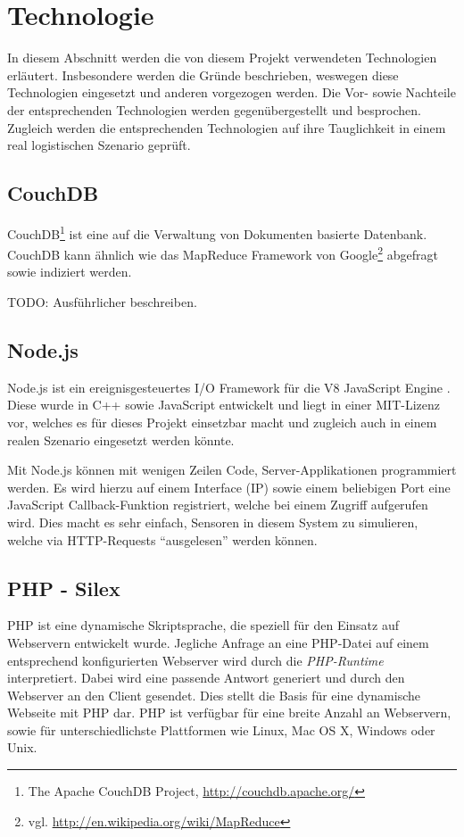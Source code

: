 \section{Technologie}
\label{sec:technology}

In diesem Abschnitt werden die von diesem Projekt verwendeten Technologien erläutert. Insbesondere werden die Gründe beschrieben, weswegen diese Technologien eingesetzt und anderen vorgezogen werden. Die Vor- sowie Nachteile der entsprechenden Technologien werden gegenübergestellt und besprochen. Zugleich werden die entsprechenden Technologien auf ihre Tauglichkeit in einem real logistischen Szenario geprüft.

\subsection{CouchDB}
\label{subsec:couchdb}
CouchDB\footnote{The Apache CouchDB Project, \url{http://couchdb.apache.org/}} ist eine auf die Verwaltung von Dokumenten basierte Datenbank. CouchDB kann ähnlich wie das MapReduce Framework von Google\footnote{vgl. \url{http://en.wikipedia.org/wiki/MapReduce}} abgefragt sowie indiziert werden.

TODO: Ausführlicher beschreiben.

\subsection{Node.js}
\label{subsec:nodejs}

Node.js ist ein ereignisgesteuertes I/O Framework für die V8 JavaScript Engine \cite{Wikipedia10a}. Diese wurde in C++ sowie JavaScript entwickelt und liegt in einer MIT-Lizenz vor, welches es für dieses Projekt einsetzbar macht und zugleich auch in einem realen Szenario eingesetzt werden könnte.

Mit Node.js können mit wenigen Zeilen Code, Server-Applikationen programmiert werden. Es wird hierzu auf einem Interface (IP) sowie einem beliebigen Port eine JavaScript Callback-Funktion registriert, welche bei einem Zugriff aufgerufen wird. Dies macht es sehr einfach, Sensoren in diesem System zu simulieren, welche via HTTP-Requests ``ausgelesen'' werden können.


\subsection{PHP - Silex}

PHP ist eine dynamische Skriptsprache, die speziell für den Einsatz auf Webservern entwickelt wurde. Jegliche Anfrage an eine PHP-Datei auf einem entsprechend konfigurierten Webserver wird durch die \emph{PHP-Runtime} interpretiert. Dabei wird eine passende Antwort generiert und durch den Webserver an den Client gesendet. Dies stellt die Basis für eine dynamische Webseite mit PHP dar. PHP ist verfügbar für eine breite Anzahl an Webservern, sowie für unterschiedlichste Plattformen wie Linux, Mac OS X, Windows oder Unix.

